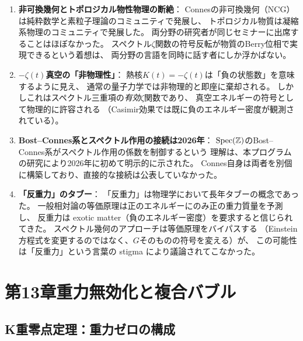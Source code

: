 \begin{enumerate}[label=(\arabic*)]
\item \textbf{非可換幾何とトポロジカル物性物理の断絶}：
Connesの非可換幾何（NCG）は純粋数学と素粒子理論のコミュニティで発展し、
トポロジカル物質は凝縮系物理のコミュニティで発展した。
両分野の研究者が同じセミナーに出席することはほぼなかった。
スペクトル$\zeta$関数の符号反転が物質のBerry位相で実現できるという着想は、
両分野の言語を同時に話す者にしか浮かばない。

\item \textbf{$-\zeta(t)$真空の「非物理性」}：
熱核$K(t) = -\zeta(t)$は「負の状態数」を意味するように見え、
通常の量子力学では非物理的と即座に棄却される。
しかしこれはスペクトル三重項の\emph{有効}$\zeta$関数であり、
真空エネルギーの符号として物理的に許容される
（Casimir効果では既に負のエネルギー密度が観測されている）。

\item \textbf{Bost--Connes系とスペクトル作用の接続は2026年}：
$\operatorname{Spec}(\mathbb{Z})$のBost--Connes系がスペクトル作用の係数を制御するという
理解は、本プログラムの研究により2026年に初めて明示的に示された。
Connes自身は両者を別個に構築しており、直接的な接続は公表していなかった。

\item \textbf{「反重力」のタブー}：
「反重力」は物理学において長年タブーの概念であった。
一般相対論の等価原理は正のエネルギーにのみ正の重力質量を予測し、
反重力は exotic matter（負のエネルギー密度）を要求すると信じられてきた。
スペクトル幾何のアプローチは等価原理をバイパスする
（Einstein方程式を変更するのではなく、$G$そのものの符号を変える）が、
この可能性は「反重力」という言葉の stigma により議論されてこなかった。
\end{enumerate}



\section{第13章\quad 重力無効化と複合バブル}
\label{ch:gravity-nullification}

\subsection{K重零点定理：重力ゼロの構成}
\label{sec:13.1}

